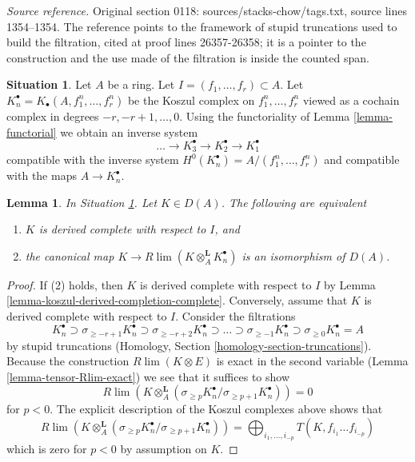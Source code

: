 \documentclass[10pt,a4paper]{amsart}
\theoremstyle{plain}
\newtheorem{lemma}[subsection]{Lemma}
\theoremstyle{definition}
\newtheorem{situation}[subsection]{Situation}
\theoremstyle{remark}
\numberwithin{equation}{subsection}
\def\lim{\mathop{\mathrm{lim}}\nolimits}
\begin{document}
\noindent\textit{Source reference.} Original section 0118: sources/stacks-chow/tags.txt, source lines 1354--1354. The reference points to the framework of stupid truncations used to build the filtration, cited at proof lines 26357-26358; it is a pointer to the construction and the use made of the filtration is inside the counted span.\par\medskip
\begin{situation}
\label{situation-koszul}
Let $A$ be a ring. Let $I = (f_1, \ldots, f_r) \subset A$. Let
$K_n^\bullet = K_\bullet(A, f_1^n, \ldots, f_r^n)$
be the Koszul complex on $f_1^n, \ldots, f_r^n$
viewed as a cochain complex in degrees $-r, -r + 1, \ldots, 0$.
Using the functoriality of Lemma \ref{lemma-functorial}
we obtain an inverse system
$$
\ldots \to K_3^\bullet \to K_2^\bullet \to K_1^\bullet
$$
compatible with the inverse system
$H^0(K_n^\bullet) = A/(f_1^n, \ldots, f_r^n)$
and compatible with the maps $A \to K_n^\bullet$.
\end{situation}

\begin{lemma}
\label{lemma-characterize-derived-complete-Koszul}
In Situation \ref{situation-koszul}. Let $K \in D(A)$.
The following are equivalent
\begin{enumerate}
\item $K$ is derived complete with respect to $I$, and
\item the canonical map $K \to R\lim (K \otimes_A^\mathbf{L} K_n^\bullet)$
is an isomorphism of $D(A)$.
\end{enumerate}
\end{lemma}

\begin{proof}
If (2) holds, then $K$ is derived complete with respect to $I$
by Lemma \ref{lemma-koszul-derived-completion-complete}.
Conversely, assume that $K$ is derived complete with respect to $I$.
Consider the filtrations
$$
K_n^\bullet \supset
\sigma_{\geq -r + 1}K_n^\bullet \supset
\sigma_{\geq -r + 2}K_n^\bullet \supset \ldots \supset
\sigma_{\geq -1}K_n^\bullet \supset
\sigma_{\geq 0}K_n^\bullet = A
$$
by stupid truncations (Homology, Section \ref{homology-section-truncations}).
Because the construction $R\lim(K \otimes E)$ is exact in
the second variable (Lemma \ref{lemma-tensor-Rlim-exact})
we see that it suffices to show
$$
R\lim \left(
K \otimes_A^\mathbf{L}
(\sigma_{\geq p}K_n^\bullet/ \sigma_{\geq p + 1}K_n^\bullet)
\right) = 0
$$
for $p < 0$. The explicit description of the Koszul complexes above
shows that
$$
R\lim \left(
K \otimes_A^\mathbf{L}
(\sigma_{\geq p}K_n^\bullet/ \sigma_{\geq p + 1}K_n^\bullet)
\right) =
\bigoplus\nolimits_{i_1, \ldots, i_{-p}}
T(K, f_{i_1}\ldots f_{i_{-p}})
$$
which is zero for $p < 0$ by assumption on $K$.
\end{proof}
\end{document}
